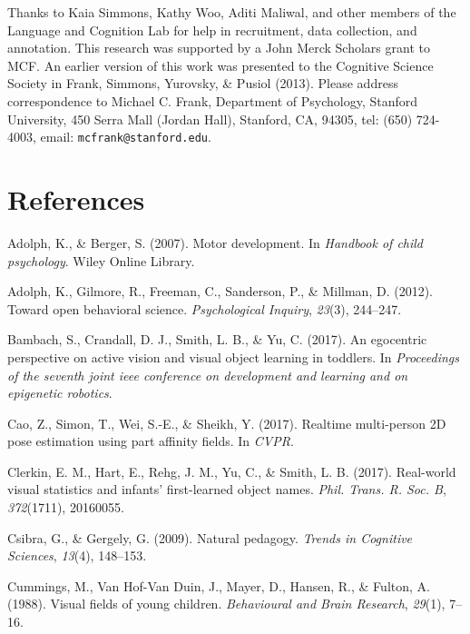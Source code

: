 \documentclass[10pt, letterpaper]{article}
\begin{document}
Thanks to Kaia Simmons, Kathy Woo, Aditi Maliwal, and other members of
the Language and Cognition Lab for help in recruitment, data collection,
and annotation. This research was supported by a John Merck Scholars
grant to MCF. An earlier version of this work was presented to the
Cognitive Science Society in Frank, Simmons, Yurovsky, \& Pusiol (2013).
Please address correspondence to Michael C. Frank, Department of
Psychology, Stanford University, 450 Serra Mall (Jordan Hall), Stanford,
CA, 94305, tel: (650) 724-4003, email: \texttt{mcfrank@stanford.edu}.

\section{References}\label{references}

\setlength{\parindent}{-0.1in} \setlength{\leftskip}{0.125in} \noindent

\hypertarget{refs}{}
\hypertarget{ref-adolph2007}{}
Adolph, K., \& Berger, S. (2007). Motor development. In \emph{Handbook
of child psychology}. Wiley Online Library.

\hypertarget{ref-adolph2012}{}
Adolph, K., Gilmore, R., Freeman, C., Sanderson, P., \& Millman, D.
(2012). Toward open behavioral science. \emph{Psychological Inquiry},
\emph{23}(3), 244--247.

\hypertarget{ref-bambach2017}{}
Bambach, S., Crandall, D. J., Smith, L. B., \& Yu, C. (2017). An
egocentric perspective on active vision and visual object learning in
toddlers. In \emph{Proceedings of the seventh joint ieee conference on
development and learning and on epigenetic robotics}.

\hypertarget{ref-cao2017realtime}{}
Cao, Z., Simon, T., Wei, S.-E., \& Sheikh, Y. (2017). Realtime
multi-person 2D pose estimation using part affinity fields. In
\emph{CVPR}.

\hypertarget{ref-clerkin2017}{}
Clerkin, E. M., Hart, E., Rehg, J. M., Yu, C., \& Smith, L. B. (2017).
Real-world visual statistics and infants' first-learned object names.
\emph{Phil. Trans. R. Soc. B}, \emph{372}(1711), 20160055.

\hypertarget{ref-csibra2009natural}{}
Csibra, G., \& Gergely, G. (2009). Natural pedagogy. \emph{Trends in
Cognitive Sciences}, \emph{13}(4), 148--153.

\hypertarget{ref-cummings1988}{}
Cummings, M., Van Hof-Van Duin, J., Mayer, D., Hansen, R., \& Fulton, A.
(1988). Visual fields of young children. \emph{Behavioural and Brain
Research}, \emph{29}(1), 7--16.
\end{document}
